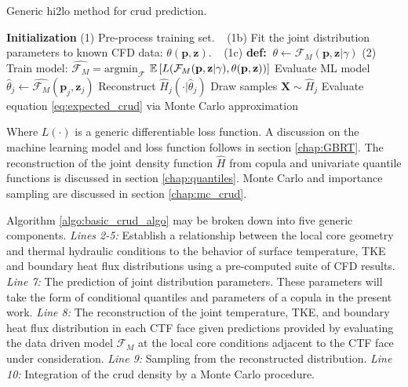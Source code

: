 \begin{algorithm}[H]
    \caption{Generic hi2lo method for crud prediction.}
    \begin{algorithmic}[1]
    \STATE \textbf{Initialization}
    \STATE (1) Pre-process training set.
    \STATE $\ \ $   (1b) Fit the joint distribution parameters to known CFD data: $\theta(\mathbf p, \mathbf z)$.
    \STATE $\ \ $   (1c) \textbf{def:}  $\ \theta \leftarrow \mathcal F_M(\mathbf p, \mathbf z | \gamma)$
    \STATE (2) Train model:  $\hat{\mathcal F_M} =  \mathrm{argmin}_{\mathcal F}$
      $\operatorname*{\mathbb{E}} \left[ L(\mathcal{F}_M (\mathbf p, \mathbf z| \gamma), \theta(\mathbf p, \mathbf z)) \right]$
    \STATE Evaluate ML model $\hat \theta_j \leftarrow \hat{\mathcal F_M}(\mathbf p_j, \mathbf z_j)$ \;
    \STATE Reconstruct $\hat H_j(\cdot |\hat \theta_j)$ \;
    \STATE Draw samples $\mathbf X \sim \hat H_j$ \;
    \STATE Evaluate equation \ref{eq:expected_crud} via Monte Carlo approximation \;
\ENDFOR
    \end{algorithmic}
\label{algo:basic_crud_algo}
\end{algorithm}
Where $L(\cdot)$ is a generic differentiable loss function.  A discussion on the machine learning model and loss function follows in section \ref{chap:GBRT}.  The reconstruction of the joint density function $\hat H$ from copula and univariate quantile functions is discussed in section \ref{chap:quantiles}.  Monte Carlo and importance sampling are discussed in section \ref{chap:mc_crud}.

Algorithm \ref{algo:basic_crud_algo} may be broken down into five generic components.  \emph{Lines 2-5:} Establish a relationship between the local core geometry and thermal hydraulic conditions to the behavior of surface temperature, TKE and boundary heat flux distributions using a pre-computed suite of CFD results. \emph{Line 7:} The prediction of joint distribution parameters. These parameters will take the form of conditional quantiles and parameters of a copula in the present work. \emph{Line 8:} The reconstruction of the joint temperature, TKE, and boundary heat flux distribution in each CTF face given predictions provided by evaluating the data driven model $\mathcal F_M$ at the local core conditions adjacent to the CTF face under consideration. \emph{Line 9:} Sampling from the reconstructed distribution.  \emph{Line 10:} Integration of the crud density by a Monte Carlo procedure.


